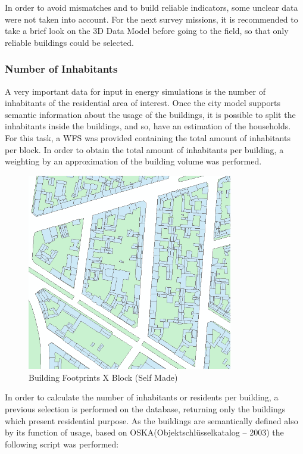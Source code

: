 \documentclass[11pt]{article}
\begin{document}
In order to avoid mismatches and to build reliable indicators, some unclear data were not taken into account. For the next survey missions, it is recommended to take a brief look on the 3D Data Model before going to the field, so that only reliable buildings could be selected.



\subsubsection{Number of Inhabitants}

A very important data for input in energy simulations is the number of inhabitants of the residential area of interest. Once the city model supports semantic information about the usage of the buildings, it is possible to split the inhabitants inside the buildings, and so, have an estimation of the households.\\
For this task, a WFS was provided containing the total amount of inhabitants per block. In order to obtain the total amount of inhabitants per building, a weighting by an approximation of the building volume was performed.

\begin{figure}[ht]
	\centering
	\includegraphics[width=0.8\textwidth]{fig3.png}
	\caption{Building Footprints X Block (Self Made)}
	\label{fig:figure3}
\end{figure}

In order to calculate the number of inhabitants or residents per building, a previous selection is performed on the database, returning only the buildings which present residential purpose. As the buildings are semantically defined also by its function of usage, based on OSKA(Objektschlüsselkatalog – 2003) the following script was performed: \\
\end{document}
